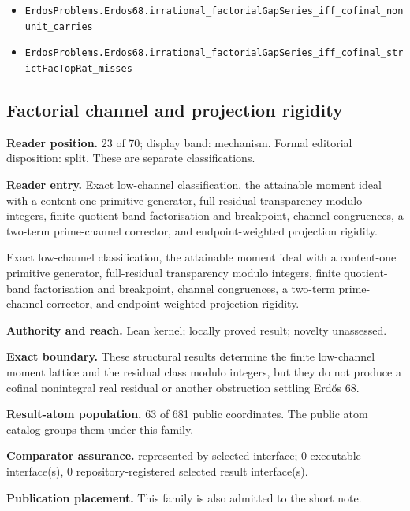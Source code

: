 \documentclass[11pt]{article}
\begin{document}
\begin{itemize}
  \item \nolinkurl{ErdosProblems.Erdos68.irrational_factorialGapSeries_iff_cofinal_nonunit_carries}
  \item \nolinkurl{ErdosProblems.Erdos68.irrational_factorialGapSeries_iff_cofinal_strictFacTopRat_misses}
\end{itemize}

\subsection{Factorial channel and projection rigidity}
\textbf{Reader position.} 23 of 70; display band: mechanism.  Formal editorial disposition: split.  These are separate classifications.

\textbf{Reader entry.} Exact low-channel classification, the attainable moment ideal with a content-one primitive generator, full-residual transparency modulo integers, finite quotient-band factorisation and breakpoint, channel congruences, a two-term prime-channel corrector, and endpoint-weighted projection rigidity.

Exact low-channel classification, the attainable moment ideal with a content-one primitive generator, full-residual transparency modulo integers, finite quotient-band factorisation and breakpoint, channel congruences, a two-term prime-channel corrector, and endpoint-weighted projection rigidity.

\textbf{Authority and reach.} Lean kernel; locally proved result; novelty unassessed.

\textbf{Exact boundary.} These structural results determine the finite low-channel moment lattice and the residual class modulo integers, but they do not produce a cofinal nonintegral real residual or another obstruction settling Erdős 68.

\textbf{Result-atom population.} 63 of 681 public coordinates. The public atom catalog groups them under this family.

\textbf{Comparator assurance.} represented by selected interface; 0 executable interface(s), 0 repository-registered selected result interface(s).

\textbf{Publication placement.} This family is also admitted to the short note.
\end{document}
